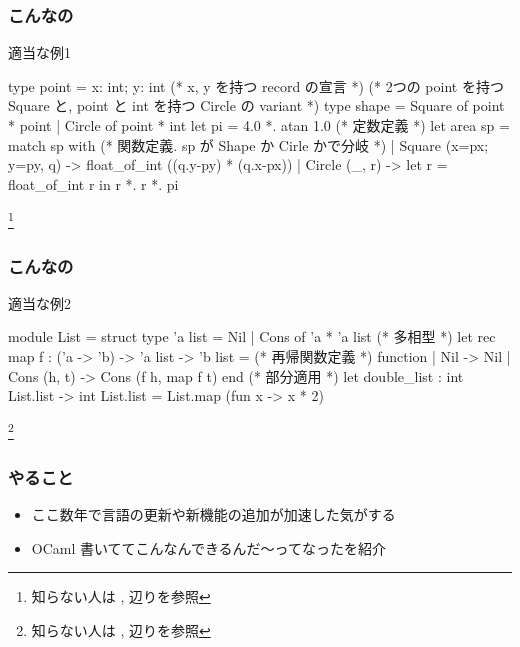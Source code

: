 \documentclass[dvipdfmx,14pt,notheorems,aspectratio=169]{beamer}
\theoremstyle{definition}
\begin{document}
    \begin{frame}[fragile]\frametitle{こんなの}
        \begin{exampleblock}{適当な例1}
            \scriptsize
            \begin{verbatimtab}
type point = { x: int; y: int } (* x, y を持つ record の宣言 *)
(* 2つの point を持つ Square と, point と int を持つ Circle の variant *)
type shape = Square of point * point | Circle of point * int 
let pi = 4.0 *. atan 1.0 (* 定数定義 *)
let area sp = match sp with (* 関数定義. sp が Shape か Cirle かで分岐 *)
    | Square ({x=px; y=py}, q) -> float_of_int ((q.y-py) * (q.x-px))
    | Circle (_, r) -> let r = float_of_int r in r *. r *. pi
\end{verbatimtab}
        \end{exampleblock}

        \footnote{知らない人は
        \cite{igarashi}, \cite{ksuenaga}
        辺りを参照}
    \end{frame}

    \begin{frame}[fragile]\frametitle{こんなの}
        \begin{exampleblock}{適当な例2}
            \scriptsize
            \begin{verbatimtab}
module List = struct
    type 'a list = Nil | Cons of 'a * 'a list (* 多相型 *)
    let rec map f : ('a -> 'b) -> 'a list -> 'b list = (* 再帰関数定義 *)
        function
        | Nil -> Nil
        | Cons (h, t) -> Cons (f h, map f t)
end
(* 部分適用 *)
let double_list : int List.list -> int List.list = List.map (fun x -> x * 2)
\end{verbatimtab}
        \end{exampleblock}

        \footnote{知らない人は
        \cite{igarashi}, \cite{ksuenaga}
        辺りを参照}
    \end{frame}

    \begin{frame}[fragile]\frametitle{やること}
        \begin{itemize}
            \item ここ数年で言語の更新や新機能の追加が加速した気がする
            \item OCaml 書いててこんなんできるんだ〜ってなったを紹介
        \end{itemize}
    \end{frame}
\end{document}
